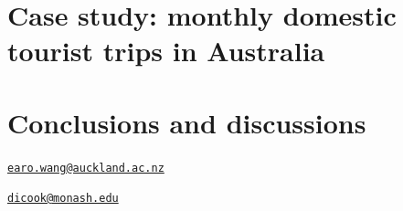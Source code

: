 \hypertarget{case-study-monthly-domestic-tourist-trips-in-australia}{%
\section{Case study: monthly domestic tourist trips in
Australia}\label{case-study-monthly-domestic-tourist-trips-in-australia}}

\hypertarget{conclusions-and-discussions}{%
\section{Conclusions and
discussions}\label{conclusions-and-discussions}}



\address{%
Earo Wang\\
The University of Auckland\\
Department of Statistics\\ The Univerisity of Auckland\\ New Zealand\\
}
\href{mailto:earo.wang@auckland.ac.nz}{\nolinkurl{earo.wang@auckland.ac.nz}}

\address{%
Dianne Cook\\
Monash University\\
Department of Econometrics and Business Statistics\\ Monash
University\\ Australia\\
}
\href{mailto:dicook@monash.edu}{\nolinkurl{dicook@monash.edu}}
